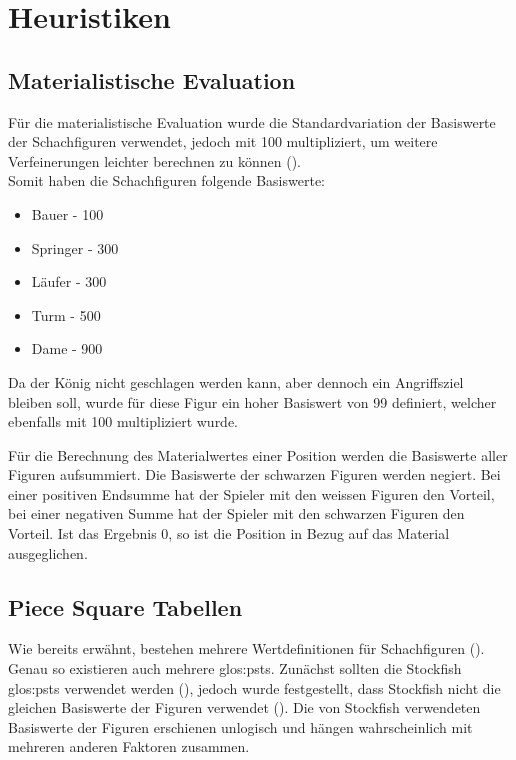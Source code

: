 \section{Heuristiken}

\subsection{Materialistische Evaluation}
Für die materialistische Evaluation wurde die Standardvariation der Basiswerte der Schachfiguren verwendet, jedoch mit 100 multipliziert, um weitere Verfeinerungen leichter berechnen zu können (\cite{evaluationofpieces}). \\
Somit haben die Schachfiguren folgende Basiswerte:
\begin{itemize}
    \item Bauer - 100
    \item Springer - 300
    \item Läufer - 300
    \item Turm - 500
    \item Dame - 900
\end{itemize}

Da der König nicht geschlagen werden kann, aber dennoch ein Angriffsziel bleiben soll, wurde für diese Figur ein hoher Basiswert von 99 definiert, welcher ebenfalls mit 100 multipliziert wurde.



\newpage

Für die Berechnung des Materialwertes einer Position werden die Basiswerte aller Figuren aufsummiert.
Die Basiswerte der schwarzen Figuren werden negiert.
Bei einer positiven Endsumme hat der Spieler mit den weissen Figuren den Vorteil, bei einer negativen Summe hat der Spieler mit den schwarzen Figuren den Vorteil. Ist das Ergebnis 0, so ist die Position in Bezug auf das Material ausgeglichen.


\subsection{Piece Square Tabellen}
Wie bereits erwähnt, bestehen mehrere Wertdefinitionen für Schachfiguren (\cite{evaluationofpieces}).
Genau so existieren auch mehrere \glspl{glos:pst}.
Zunächst sollten die Stockfish \glspl{glos:pst} verwendet werden (\cite{piecesquaretablelichessstockfish}), jedoch wurde festgestellt, dass Stockfish nicht die gleichen Basiswerte der Figuren verwendet (\cite{piecevalueslichessstockfish}).
Die von Stockfish verwendeten Basiswerte der Figuren erschienen unlogisch und hängen wahrscheinlich mit mehreren anderen Faktoren zusammen.

